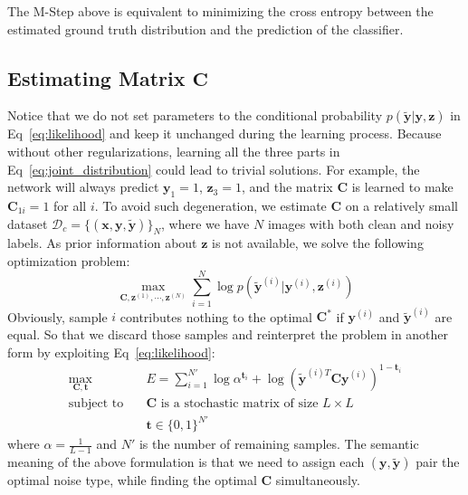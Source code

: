 \documentclass[10pt,twocolumn,letterpaper]{article}
\def\vec{\mathbf}
\def\mat{\mathbf}
\begin{document}
The M-Step above is equivalent to minimizing the cross entropy between the estimated ground truth distribution and the prediction of the classifier.

\subsection{Estimating Matrix $\mat{C}$} %
\label{sub:confusion_estimation}
Notice that we do not set parameters to the conditional probability $p(\tilde{\vec{y}}|\vec{y},\vec{z})$ in Eq~\eqref{eq:likelihood} and keep it unchanged during the learning process. Because without other regularizations, learning all the three parts in Eq~\eqref{eq:joint_distribution} could lead to trivial solutions. For example, the network will always predict $\vec{y}_1 = 1$, $\vec{z}_3 = 1$, and the matrix $\mat{C}$ is learned to make $\mat{C}_{1i} = 1$ for all $i$. To avoid such degeneration, we estimate $\mat{C}$ on a relatively small dataset $\mathcal{D}_c = \{(\vec{x},\vec{y},\tilde{\vec{y}})\}_N$, where we have $N$ images with both clean and noisy labels. As prior information about $\vec{z}$ is not available, we solve the following optimization problem:
\begin{equation} \label{eq:opt_all}
    \max_{\mat{C},\vec{z}^{(1)},\cdots,\vec{z}^{(N)}} \sum_{i=1}^N \log p(\tilde{\vec{y}}^{(i)}|\vec{y}^{(i)},\vec{z}^{(i)})
\end{equation}
Obviously, sample $i$ contributes nothing to the optimal $\mat{C}^*$ if $\vec{y}^{(i)}$ and $\tilde{\vec{y}}^{(i)}$ are equal. So that we discard those samples and reinterpret the problem in another form by exploiting Eq~\ref{eq:likelihood}:
\begin{equation}
\begin{aligned}
\max_{\mat{C},\vec{t}} \quad & E=\sum_{i=1}^{N'} \log \alpha^{\vec{t}_i} + \log (\tilde{\vec{y}}^{(i)T} \mat{C} \vec{y}^{(i)})^{1-\vec{t}_i}\\
\text{subject to} \quad & \mat{C} \text{ is a stochastic matrix of size } L\times L \\
                    & \vec{t} \in \{0,1\}^{N'}
\end{aligned}
\end{equation}
where $\alpha=\frac{1}{L-1}$ and $N'$ is the number of remaining samples. The semantic meaning of the above formulation is that we need to assign each $(\vec{y},\tilde{\vec{y}})$ pair the optimal noise type, while finding the optimal $\mat{C}$ simultaneously.
\end{document}
